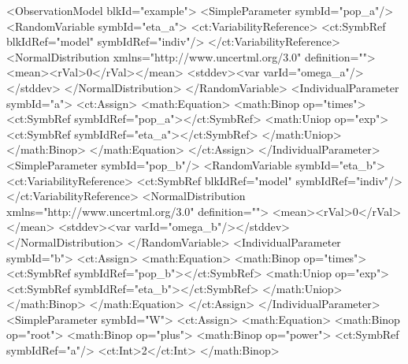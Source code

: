 \documentclass[a4paper,10pt]{article}
\begin{document}
\begin{xmlcode}
        <ObservationModel blkId="example">
            <SimpleParameter symbId="pop_a"/>
            <RandomVariable symbId="eta_a">
                <ct:VariabilityReference>
                    <ct:SymbRef blkIdRef="model" symbIdRef="indiv"/>
                </ct:VariabilityReference>
                <NormalDistribution xmlns="http://www.uncertml.org/3.0" definition="">
                    <mean><rVal>0</rVal></mean>
                    <stddev><var varId="omega_a"/></stddev>
                </NormalDistribution>
            </RandomVariable>
            <IndividualParameter symbId="a">
                <ct:Assign>
                    <math:Equation>
                        <math:Binop op="times">
                            <ct:SymbRef symbIdRef="pop_a"></ct:SymbRef>
                            <math:Uniop op="exp">
                                <ct:SymbRef symbIdRef="eta_a"></ct:SymbRef>
                            </math:Uniop>
                        </math:Binop>
                    </math:Equation>
                </ct:Assign>
            </IndividualParameter>
            <SimpleParameter symbId="pop_b"/>
            <RandomVariable symbId="eta_b">
                <ct:VariabilityReference>
                    <ct:SymbRef blkIdRef="model" symbIdRef="indiv"/>
                </ct:VariabilityReference>
                <NormalDistribution xmlns="http://www.uncertml.org/3.0" definition="">
                    <mean><rVal>0</rVal></mean>
                    <stddev><var varId="omega_b"/></stddev>
                </NormalDistribution>
            </RandomVariable>
            <IndividualParameter symbId="b">
                <ct:Assign>
                    <math:Equation>
                        <math:Binop op="times">
                            <ct:SymbRef symbIdRef="pop_b"></ct:SymbRef>
                            <math:Uniop op="exp">
                                <ct:SymbRef symbIdRef="eta_b"></ct:SymbRef>
                            </math:Uniop>
                        </math:Binop>
                    </math:Equation>
                </ct:Assign>
            </IndividualParameter>
            <SimpleParameter symbId="W">
                <ct:Assign>
                    <math:Equation>
                        <math:Binop op="root">
                            <math:Binop op="plus">
                                <math:Binop op="power">
                                    <ct:SymbRef symbIdRef="a"/>
                                    <ct:Int>2</ct:Int>
                                </math:Binop>

\end{xmlcode}
\end{document}
